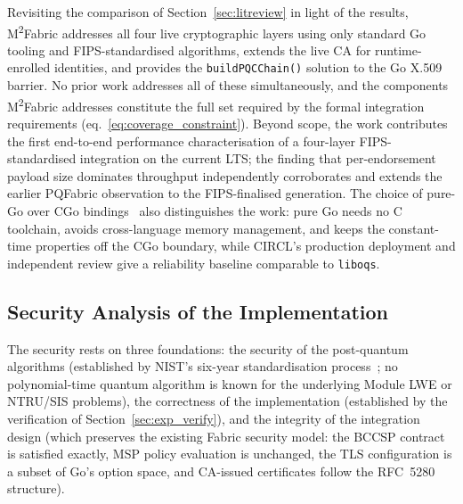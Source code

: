 \documentclass{ieeetj}
\newcommand{\mfabric}{M\textsuperscript{2}Fabric}
\begin{document}
Revisiting the comparison of Section~\ref{sec:litreview} in light of the results,
\mfabric{} addresses all four live cryptographic layers using only standard Go
tooling and FIPS-standardised algorithms, extends the live CA for runtime-enrolled
identities, and provides the \texttt{buildPQCChain()} solution to the Go X.509
barrier. No prior work addresses all of these simultaneously, and the components
\mfabric{} addresses constitute the full set required by the formal integration
requirements (eq.~\ref{eq:coverage_constraint}). Beyond scope, the work
contributes the first end-to-end performance characterisation of a four-layer
FIPS-standardised integration on the current LTS; the finding that
per-endorsement payload size dominates throughput independently corroborates and
extends the earlier PQFabric observation to the FIPS-finalised generation. The
choice of pure-Go over CGo bindings~\cite{stebila2016oqs} also distinguishes the
work: pure Go needs no C toolchain, avoids cross-language memory management, and
keeps the constant-time properties off the CGo boundary, while CIRCL's
production deployment and independent review give a reliability baseline
comparable to \texttt{liboqs}.

\subsection{Security Analysis of the Implementation}
\label{sec:res_security}

The security rests on three foundations: the security of the post-quantum
algorithms (established by NIST's six-year standardisation
process~\cite{alagic2022nist}; no polynomial-time quantum algorithm is known for
the underlying Module LWE or NTRU/SIS problems), the correctness of the
implementation (established by the verification of Section~\ref{sec:exp_verify}),
and the integrity of the integration design (which preserves the existing Fabric
security model: the BCCSP contract is satisfied exactly, MSP policy evaluation is
unchanged, the TLS configuration is a subset of Go's option space, and CA-issued
certificates follow the RFC~5280 structure).
\end{document}
